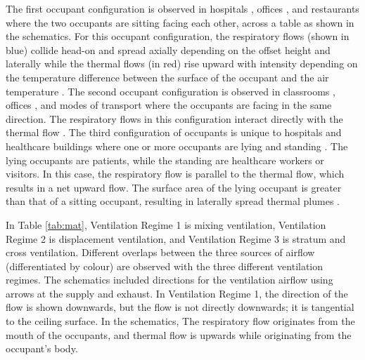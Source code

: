 \documentclass[a4paper,12pt]{elsarticle}
\begin{document}
The first occupant configuration is observed in hospitals \cite{zhou2021experimental}, offices \cite{li2023numerical}, and restaurants \cite{oksanen2022combining} where the two occupants are sitting facing each other, across a table as shown in the schematics. For this occupant configuration, the respiratory flows (shown in blue) collide head-on and spread axially depending on the offset height and laterally \cite{giri2022colliding, singhal2022virus} while the thermal flows (in red) rise upward with intensity depending on the temperature difference between the surface of the occupant and the air temperature \cite{zhang2019distribution}. The second occupant configuration is observed in classrooms \cite{qin2023transmission}, offices \cite{he2011cfd}, and modes of transport \cite{yan2021transmission,ho2021modeling} where the occupants are facing in the same direction. The respiratory flows in this configuration interact directly with the thermal flow \cite{ou2022insufficient}. The third configuration of occupants is unique to hospitals and healthcare buildings where one or more occupants are lying and standing \cite{villafruela2019assessment, lu2020reducing}. The lying occupants are patients, while the standing are healthcare workers or visitors. In this case, the respiratory flow is parallel to the thermal flow, which results in a net upward flow. The surface area of the lying occupant is greater than that of a sitting occupant, resulting in laterally spread thermal plumes \cite{feng2020influence}.

In Table \ref{tab:mat}, Ventilation Regime 1 is mixing ventilation, Ventilation Regime 2 is displacement ventilation, and Ventilation Regime 3 is stratum and cross ventilation. Different overlaps between the three sources of airflow (differentiated by colour) are observed with the three different ventilation regimes. The schematics included directions for the ventilation airflow using arrows at the supply and exhaust. In Ventilation Regime 1, the direction of the flow is shown downwards, but the flow is not directly downwards; it is tangential to the ceiling surface. In the schematics, The respiratory flow originates from the mouth of the occupants, and thermal flow is upwards while originating from the occupant's body. 
\end{document}
